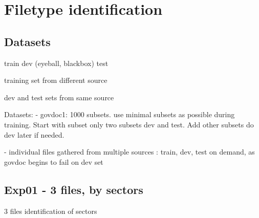 \section{Filetype identification}
\subsection{Datasets}
train
dev (eyeball, blackbox)
test

training set from different source

dev and test sets from same source

Datasets:
- govdoc1: 1000 subsets. use minimal subsets as possible during training.
Start with subset only two subsets dev and test. Add other subsets do dev later if needed.

- individual files gathered from multiple sources : train, dev, test
on demand, as govdoc begins to fail on dev set



\subsection{Exp01 - 3 files, by sectors}
3 files
identification of sectors
